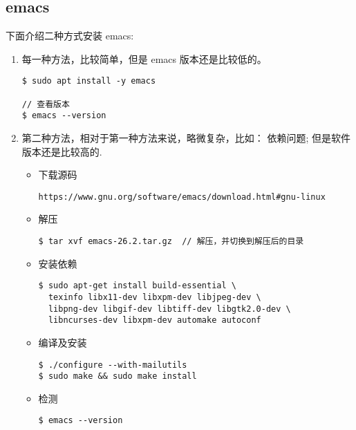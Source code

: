 \subsection{emacs}
下面介绍二种方式安装 emacs:
\flushleft
\begin{enumerate}
\item 每一种方法，比较简单，但是 emacs 版本还是比较低的。
\begin{lstlisting}
$ sudo apt install -y emacs 

// 查看版本
$ emacs --version  
\end{lstlisting}

\item 第二种方法，相对于第一种方法来说，略微复杂，比如： 依赖问题;
但是软件版本还是比较高的.

\begin{itemize}
\item 下载源码 \\ 
\begin{lstlisting}
https://www.gnu.org/software/emacs/download.html#gnu-linux
\end{lstlisting}

\item 解压
\begin{lstlisting}
$ tar xvf emacs-26.2.tar.gz  // 解压，并切换到解压后的目录
\end{lstlisting}

\item 安装依赖
\begin{lstlisting}
$ sudo apt-get install build-essential \
  texinfo libx11-dev libxpm-dev libjpeg-dev \
  libpng-dev libgif-dev libtiff-dev libgtk2.0-dev \
  libncurses-dev libxpm-dev automake autoconf 
\end{lstlisting}

\item 编译及安装
\begin{lstlisting}
$ ./configure --with-mailutils 
$ sudo make && sudo make install  
\end{lstlisting}

\item 检测
\begin{lstlisting}
$ emacs --version
\end{lstlisting}

\end{itemize}
\end{enumerate}
\newpage

